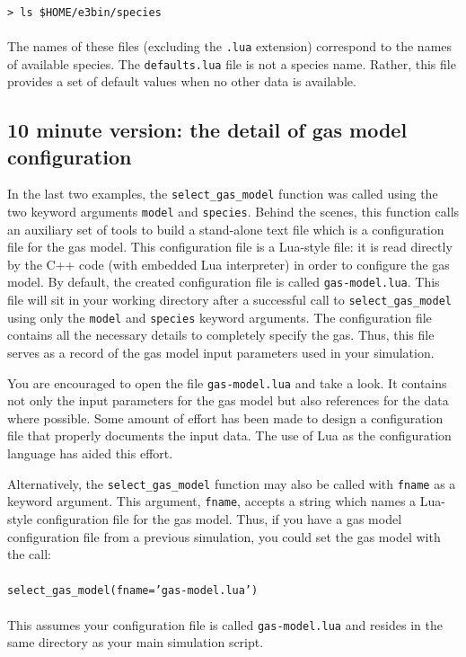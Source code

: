 \noindent
\topbar\\
\texttt{> ls \$HOME/e3bin/species}\\
\bottombar\\
%
The names of these files (excluding the \texttt{.lua} extension) correspond to the
names of available species.  The \texttt{defaults.lua} file is not a species name.
Rather, this file provides a set of default values when no other data is available.

\subsection{10 minute version: the detail of gas model configuration}
In the last two examples, the \texttt{select\_gas\_model} function was called using
the two keyword arguments \texttt{model} and \texttt{species}.
Behind the scenes, this function calls an auxiliary set of tools to build
a stand-alone text file which is a configuration file for the gas model.
This configuration file is a Lua-style file: it is read directly by the
C++ code (with embedded Lua interpreter) in order to configure the gas model.
By default, the created configuration file is called \texttt{gas-model.lua}.
This file will sit in your working directory after a successful call to
\texttt{select\_gas\_model} using only the \texttt{model} and \texttt{species} keyword
arguments.
The configuration file contains all the necessary details to completely
specify the gas.
Thus, this file serves as a record of the gas model input parameters used in
your simulation.

\medskip
You are encouraged to open the file \texttt{gas-model.lua} and take a look.
It contains not only the input parameters for the gas model but also references for the
data where possible.
Some amount of effort has been made to design a configuration file that
properly documents the input data.
The use of Lua as the configuration language has aided this effort.

\medskip
Alternatively, the \texttt{select\_gas\_model} function may also be called
with \texttt{fname} as a keyword argument.
This argument, \texttt{fname}, accepts a string which names a Lua-style configuration
file for the gas model.
Thus, if you have a gas model configuration file from a previous simulation, you could
set the gas model with the call:\\
%
\topbar\\
\texttt{select\_gas\_model(fname='gas-model.lua')}\\
\bottombar\\
%
This assumes your configuration file is called \texttt{gas-model.lua} and resides
in the same directory as your main simulation script.

